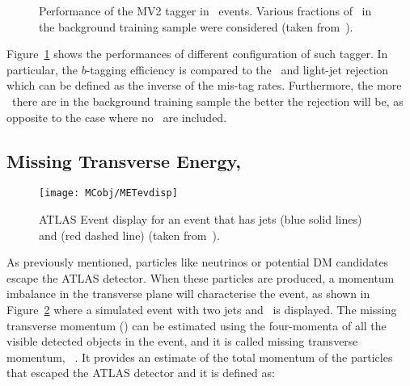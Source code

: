 			\begin{figure}[!htb]
				\begin{center}
					\hspace{0.05\textwidth}
				\end{center}
				\caption{Performance of the MV2 tagger in \ttbar\ events. Various fractions of \cjs\ in the background training sample were considered (taken from~\cite{ATL-PHYS-PUB-2016-012}).}
				\label{fig:btagEff}
			\end{figure}

			Figure~\ref{fig:btagEff} shows the performances of different configuration of such tagger. In particular, the $b$-tagging efficiency is compared to the \cjs\ and light-jet rejection which can be defined as the inverse of the mis-tag rates. Furthermore, the more \cj\ there are in the background training sample the better the rejection will be, as opposite to the case where no \cjs\ are included. 



		\subsection*{Missing Transverse Energy, \met}

			\begin{figure}[!htb]
				\centering
				\texttt{[image: MCobj/METevdisp]}
				\caption{\label{fig:METevdisp}ATLAS Event display for an event that has jets (blue solid lines) and \met (red dashed line) (taken from~\cite{METevdisp}).}
			\end{figure}

			As previously mentioned, particles like neutrinos or potential \ac{DM} candidates escape the \ac{ATLAS} detector. When these particles are produced, a momentum imbalance in the transverse plane will characterise the event, as shown in Figure~\ref{fig:METevdisp} where a simulated event with two jets and \met\ is displayed. The missing transverse momentum (\ptmiss) can be estimated using the four-momenta of all the visible detected objects in the event, and it is called missing transverse momentum, \ptmiss~\cite{ATLASMet2015}. It provides an estimate of the total momentum of the particles that escaped the \ac{ATLAS} detector and it is defined as: 

